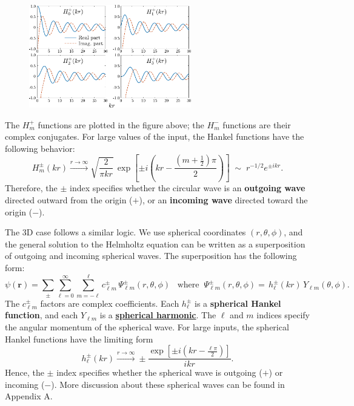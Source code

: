 \documentclass[pra,12pt]{revtex4}
\begin{document}
\begin{figure}[h!]
  \centering\includegraphics[width=0.63\textwidth]{besselh}
\end{figure}

The $H^+_m$ functions are plotted in the figure above; the $H^-_m$
functions are their complex conjugates.  For large values of the
input, the Hankel functions have the following behavior:
\begin{equation}
  H_m^\pm(kr) \overset{r\rightarrow\infty}{\longrightarrow} \sqrt{\frac{2}{\pi kr}} \, \exp\left[\pm i\left(kr - \frac{(m+\frac{1}{2})\pi}{2}\right)\right] \;\sim\; r^{-1/2} e^{\pm ikr}.
\end{equation}
Therefore, the $\pm$ index specifies whether the circular wave is an
\textbf{outgoing wave} directed outward from the origin ($+$), or an
\textbf{incoming wave} directed toward the origin ($-$).

The 3D case follows a similar logic.  We use spherical coordinates
$(r,\theta,\phi)$, and the general solution to the Helmholtz equation
can be written as a superposition of outgoing and incoming spherical
waves.  The superposition has the following form:
\begin{equation}
  \psi(\mathbf{r})=\sum_{\pm}\sum_{\ell=0}^\infty\sum_{m=-\ell}^\ell c_{\ell m}^\pm \,\Psi_{\ell m}^\pm(r,\theta,\phi)\;\;\;\mathrm{where}\;\;\Psi_{\ell m}^\pm(r,\theta,\phi) = \,h_\ell^\pm(kr)\,Y_{\ell m}(\theta,\phi).
\end{equation}
The $c_{\ell m}^\pm$ factors are complex coefficients.  Each
$h_\ell^\pm$ is a \textbf{spherical Hankel function}, and each
$Y_{\ell m}$ is a
\href{https://en.wikipedia.org/wiki/Spherical_harmonics}{\textbf{spherical
    harmonic}}.  The $\ell$ and $m$ indices specify the angular
momentum of the spherical wave.  For large inputs, the spherical
Hankel functions have the limiting form
\begin{equation}
  h_\ell^\pm(kr) \overset{r\rightarrow\infty}{\longrightarrow} \pm \frac{\exp\!\left[\pm i\!\left(kr-\frac{\ell\pi}{2}\right)\right]}{ikr}.
\end{equation}
Hence, the $\pm$ index specifies whether the spherical wave is
outgoing ($+$) or incoming ($-$).  More discussion about these
spherical waves can be found in Appendix A.
\end{document}
